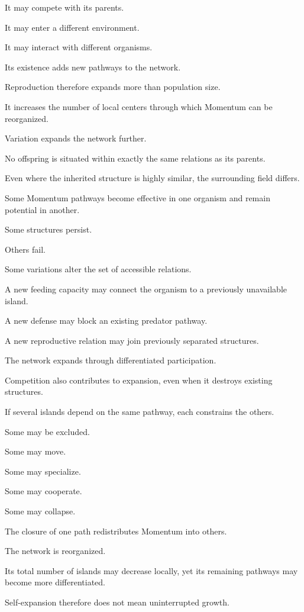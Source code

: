 It may compete with its parents.

It may enter a different environment.

It may interact with different organisms.

Its existence adds new pathways to the network.

Reproduction therefore expands more than population size.

It increases the number of local centers through which Momentum can be reorganized.

Variation expands the network further.

No offspring is situated within exactly the same relations as its parents.

Even where the inherited structure is highly similar, the surrounding field differs.

Some Momentum pathways become effective in one organism and remain potential in another.

Some structures persist.

Others fail.

Some variations alter the set of accessible relations.

A new feeding capacity may connect the organism to a previously unavailable island.

A new defense may block an existing predator pathway.

A new reproductive relation may join previously separated structures.

The network expands through differentiated participation.

Competition also contributes to expansion, even when it destroys existing structures.

If several islands depend on the same pathway, each constrains the others.

Some may be excluded.

Some may move.

Some may specialize.

Some may cooperate.

Some may collapse.

The closure of one path redistributes Momentum into others.

The network is reorganized.

Its total number of islands may decrease locally, yet its remaining pathways may become more differentiated.

Self-expansion therefore does not mean uninterrupted growth.

